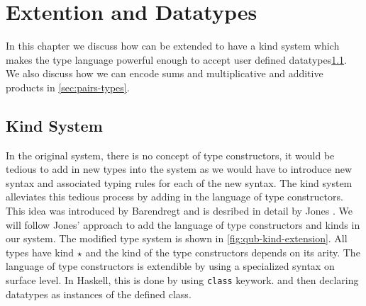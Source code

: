 \chapter{\qub{} Extention and Datatypes}\label{chp:datatypes}

In this chapter we discuss how \qub{} can be extended to have a kind system which makes
the type language powerful enough to accept user defined datatypes\cref{sec:kind-system}. We also discuss
how we can encode sums and multiplicative and additive products in \cref{sec:pairs-types}.


\section{Kind System}\label{sec:kind-system}
In the original system, there is no concept of type constructors, it would be tedious to add in
new types into the system as we would have to introduce new syntax and associated typing rules for
each of the new syntax. The kind system alleviates this tedious process by adding in the language
of type constructors. This idea was introduced by Barendregt \citeyearpar{barendregt_1991} and
is desribed in detail by Jones \citeyearpar{jones_system_1993}. We will follow Jones' approach
to add the language of type constructors and kinds in our system. The modified type system is shown in \cref{fig:qub-kind-extension}. All types have kind $\star$ and the
kind of the type constructors depends on its arity. The language of type constructors is extendible
by using a specialized syntax on surface level. In Haskell, this is done by using \texttt{class} keywork.
and then declaring datatypes as instances of the defined class.

